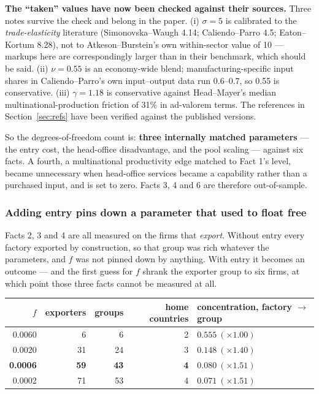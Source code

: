 \documentclass[11pt]{article}
\newenvironment{keypoint}
  {\begin{lrbox}{\kbox}\begin{minipage}{0.93\textwidth}\vspace{3pt}}
  {\vspace{3pt}\end{minipage}\end{lrbox}\begin{center}\fbox{\usebox{\kbox}}\end{center}}
\theoremstyle{plain}
\theoremstyle{remark}
\theoremstyle{definition}
\begin{document}
\begin{keypoint}
\textbf{The ``taken'' values have now been checked against their sources.} Three
notes survive the check and belong in the paper. (i) $\sigma=5$ is calibrated to the
\emph{trade-elasticity} literature (Simonovska--Waugh 4.14; Caliendo--Parro 4.5;
Eaton--Kortum 8.28), not to Atkeson--Burstein's own within-sector value of 10 --- markups
here are correspondingly larger than in their benchmark, which should be said.
(ii) $\nu=0.55$ is an economy-wide blend; manufacturing-specific input shares in
Caliendo--Parro's own input--output data run 0.6--0.7, so 0.55 is conservative.
(iii) $\gamma=1.18$ is conservative against Head--Mayer's median multinational-production
friction of 31\% in ad-valorem terms. The references in Section~\ref{sec:refs} have
been verified against the published versions.

So the degrees-of-freedom count is: \textbf{three internally matched parameters} ---
the entry cost, the head-office disadvantage, and the pool scaling --- against six
facts. A fourth, a multinational productivity edge matched to Fact 1's level, became
unnecessary when head-office services became a capability rather than a purchased
input, and is set to zero. Facts 3, 4 and 6 are therefore out-of-sample.
\end{keypoint}

\subsubsection{Adding entry pins down a parameter that used to float free}

Facts 2, 3 and 4 are all measured on the firms that \emph{export}. Without entry every
factory exported by construction, so that group was rich whatever the parameters, and
$f$ was not pinned down by anything. With entry it becomes an outcome --- and the first
guess for $f$ shrank the exporter group to six firms, at which point those three facts
cannot be measured at all.

\begin{center}
\begin{tabular}{rrrrl}
\toprule
$f$ & exporters & groups & home countries & concentration, factory $\to$ group\\
\midrule
0.0060 & 6  & 6  & 2 & $0.555\ (\times1.00)$\\
0.0020 & 31 & 24 & 3 & $0.148\ (\times1.40)$\\
\textbf{0.0006} & \textbf{59} & \textbf{43} & \textbf{4} & $\mathbf{0.080\ (\times1.51)}$\\
0.0002 & 71 & 53 & 4 & $0.071\ (\times1.51)$\\
\bottomrule
\end{tabular}
\end{center}
\end{document}
